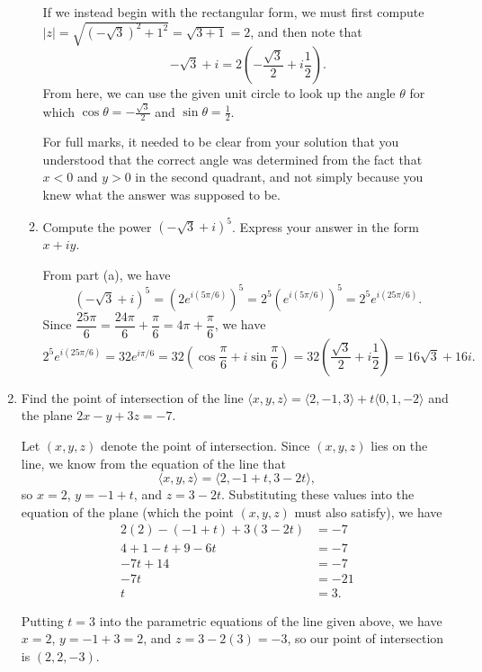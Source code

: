 \documentclass[12pt]{article}
\newcommand{\points}[1]{\marginpar{\hspace{24pt}[#1]}}
\newcommand{\abs}[1]{\lvert #1\rvert}
\begin{document}
\begin{enumerate}
\begin{enumerate}
If we instead begin with the rectangular form, we must first compute \\$\abs{z} = \sqrt{(-\sqrt{3})^2+1^2} = \sqrt{3+1}=2$, and then note that
\[
 -\sqrt{3}+i = 2\left(-\frac{\sqrt{3}}{2}+i\frac{1}{2}\right).
\]
From here, we can use the given unit circle to look up the angle $\theta$ for which $\cos\theta = -\frac{\sqrt{3}}{2}$ and $\sin\theta = \frac{1}{2}$.

For full marks, it needed to be clear from your solution that you understood that the correct angle was determined from the fact that $x<0$ and $y>0$ in the second quadrant, and not simply because you knew what the answer was supposed to be.

\medskip


 \item Compute the power $(-\sqrt{3}+i)^5$. Express your answer in the form $x+iy$. \points{5}

\bigskip

From part (a), we have
\[
 (-\sqrt{3}+i)^5 = \left(2e^{i(5\pi/6)}\right)^5 = 2^5\left(e^{i(5\pi/6)}\right)^5 = 2^5e^{i(25\pi/6)}.
\]
Since $\dfrac{25\pi}{6} = \dfrac{24\pi}{6}+\dfrac{\pi}{6} = 4\pi+\dfrac{\pi}{6}$, we have
\[
 2^5e^{i(25\pi/6)} = 32e^{i\pi/6} = 32\left(\cos \frac{\pi}{6}+i\sin\frac{\pi}{6}\right) = 32\left(\frac{\sqrt{3}}{2}+i\frac{1}{2}\right) = 16\sqrt{3}+16i.
\]

\end{enumerate}

\item Find the point of intersection of the line $\langle x,y,z\rangle = \langle 2,-1,3\rangle+t\langle 0,1,-2\rangle$ and the plane $2x-y+3z=-7$. \points{4}

\bigskip

Let $(x,y,z)$ denote the point of intersection. Since $(x,y,z)$ lies on the line, we know from the equation of the line that
\[
 \langle x,y,z\rangle = \langle 2, -1+t, 3-2t\rangle,
\]
so $x=2$, $y=-1+t$, and $z=3-2t$. Substituting these values into the equation of the plane (which the point $(x,y,z)$ must also satisfy), we have
\begin{align*}
 2(2)-(-1+t)+3(3-2t) & = -7\\
 4+1-t+9-6t & = -7\\
 -7t+14 & = -7\\
 -7t & = -21\\
 t&=3.
\end{align*}

Putting $t=3$ into the parametric equations of the line given above, we have $x=2$, $y=-1+3=2$, and $z=3-2(3) = -3$, so our point of intersection is $(2,2,-3)$.


\end{enumerate}
\end{document}
